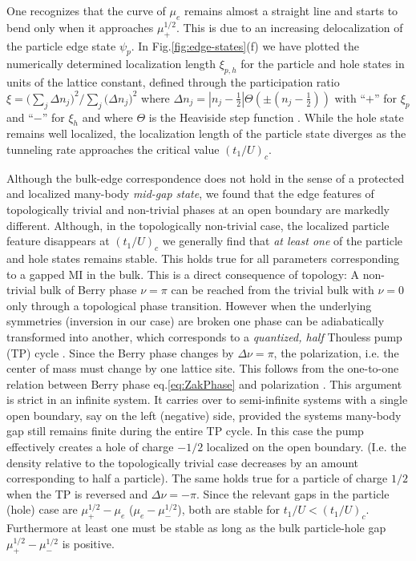 \documentclass[pra,aps,twocolumn,showpacs]{revtex4}
\begin{document}
One recognizes that the curve of $\mu_e$ remains almost a straight line and starts to bend only
when it approaches $\mu^{1/2}_+$. This is due to an increasing delocalization of the 
particle edge state $\psi_p$. In Fig.\ref{fig:edge-states}(f) we have plotted
the numerically determined localization length $\xi_{p,h}$ for the particle and hole 
states in units of the lattice constant,
defined through the participation ratio $\xi=\bigl(\sum_j \Delta n_j\bigr)^2/\sum_j \bigl(\Delta n_j \bigr)^2$ where 
$\Delta n_j =|n_j-\frac{1}{2}| \Theta \left( \pm ( n_j - \frac{1}{2} ) \right)$
with ``$+$'' for $\xi_p$ and ``$-$'' for $\xi_h$ and where $\Theta$ is the Heaviside step function \cite{Murphy2011}.
While the hole state remains well localized, the localization
length of the particle state diverges as the tunneling rate approaches the critical value $(t_1/U)_c$.

Although the bulk-edge correspondence does not hold in the sense of a 
protected and localized many-body \emph{mid-gap state}, we found that the edge features 
of topologically trivial and non-trivial phases at an open boundary are markedly 
different. 
Although, in the topologically non-trivial case, the localized particle feature disappears at $(t_1/U)_c$ we 
generally find that \emph{at least one} of the particle and hole states remains stable. This holds true for all 
parameters corresponding to a gapped MI in the bulk.
This is a direct consequence of topology: A non-trivial bulk of Berry phase 
$\nu=\pi$ can be reached from the trivial bulk with $\nu=0$ only through a 
topological phase transition. However when the underlying symmetries (inversion in our case) are broken 
one phase can be adiabatically transformed into another, which corresponds to a \emph{quantized, half} 
Thouless pump (TP) cycle \cite{Thouless-PRB-1983}. Since the Berry phase changes by $\Delta \nu=\pi$, 
the polarization, i.e. the center of mass must change by one lattice site. This follows 
from the one-to-one relation between Berry phase eq.\eqref{eq:ZakPhase} and polarization \cite{Kingsmith1993,Ortiz1994}.
This argument is strict in an infinite system. It carries over to semi-infinite systems with a single 
open boundary, say on the left (negative) side, provided the systems many-body gap still remains finite during the 
entire TP cycle. In this case the pump effectively creates a hole of charge $-1/2$ 
localized on the open boundary. (I.e. the density relative to the topologically trivial case decreases by 
an amount corresponding to half a particle). The same holds true for a particle of charge $1/2$ 
when the TP is reversed and $\Delta \nu = -\pi$. Since the relevant gaps 
in the particle (hole) case are $\mu^{1/2}_+-\mu_e$ ($\mu_e-\mu^{1/2}_-$), both are stable for $t_1/U < (t_1/U)_c$.
Furthermore at least one must be stable as long as the bulk particle-hole gap $\mu_+^{1/2}-\mu_-^{1/2}$ is positive.
\end{document}
